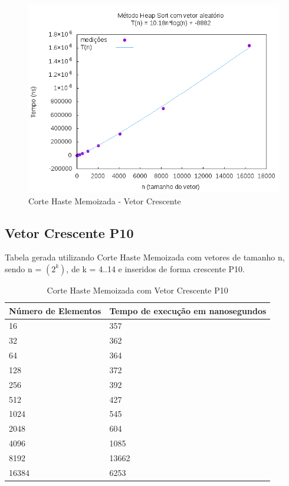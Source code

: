 \documentclass[12pt,a4paper,twoside]{report}
\begin{document}
\begin{figure}[H]
    \centering
    \includegraphics[width=0.7\linewidth]{graficos/HeapSort/vIntAleatorio/vIntAleatorio.png}
  \caption{Corte Haste Memoizada - Vetor Crescente}
\end{figure}






\subsection{Vetor Crescente P10}
Tabela gerada utilizando Corte Haste Memoizada com vetores de tamanho n, sendo n = $(2^k)$, de k = 4..14 e inseridos de forma crescente P10.
\begin{table}[H]
\centering
\caption{Corte Haste Memoizada com Vetor Crescente P10}
\label{my-label}
\begin{tabular}{|l|l|}
\hline
\multicolumn{1}{|c|}{\textbf{Número de Elementos}} & \multicolumn{1}{c|}{\textbf{Tempo de execução em nanosegundos}} \\ \hline
16 & 357 \\ \hline
32 & 362 \\ \hline
64 & 364 \\ \hline
128 & 372 \\ \hline
256 & 392 \\ \hline
512 & 427 \\ \hline
1024 & 545 \\ \hline
2048 & 604 \\ \hline
4096 & 1085 \\ \hline
8192 & 13662 \\ \hline
16384 & 6253 \\ \hline
\end{tabular}
\end{table}
\end{document}
